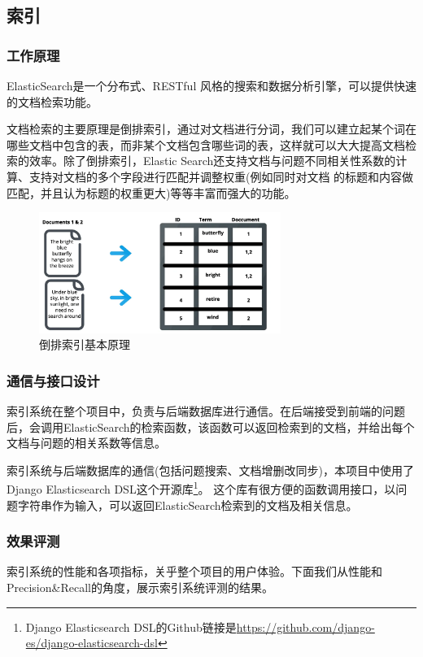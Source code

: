 \documentclass[12pt]{article}
\begin{document}
\subsection{索引}  %
\subsubsection{工作原理}
ElasticSearch是一个分布式、RESTful 风格的搜索和数据分析引擎，可以提供快速的文档检索功能。

文档检索的主要原理是倒排索引，通过对文档进行分词，我们可以建立起某个词在哪些文档中包含的表，而非某个文档包含哪些词的表，这样就可以大大提高文档检索的效率。除了倒排索引，Elastic Search还支持文档与问题不同相关性系数的计算、支持对文档的多个字段进行匹配并调整权重(例如同时对文档 的标题和内容做匹配，并且认为标题的权重更大)等等丰富而强大的功能。


\begin{figure}[htbp]  %
    \centering  %
    \includegraphics[width=0.7\textwidth]{fig/inverse-index.png}  %
    \caption{倒排索引基本原理}  %
    \label{fig:inverted-index}  %
\end{figure}
    

\subsubsection{通信与接口设计}
索引系统在整个项目中，负责与后端数据库进行通信。在后端接受到前端的问题后，会调用ElasticSearch的检索函数，该函数可以返回检索到的文档，并给出每个文档与问题的相关系数等信息。

索引系统与后端数据库的通信(包括问题搜索、文档增删改同步)，本项目中使用了Django Elasticsearch DSL这个开源库\footnote{Django Elasticsearch DSL的Github链接是\url{https://github.com/django-es/django-elasticsearch-dsl}}。
这个库有很方便的函数调用接口，以问题字符串作为输入，可以返回ElasticSearch检索到的文档及相关信息。

\subsubsection{效果评测}
索引系统的性能和各项指标，关乎整个项目的用户体验。下面我们从性能和Precision\&Recall的角度，展示索引系统评测的结果。
\end{document}
